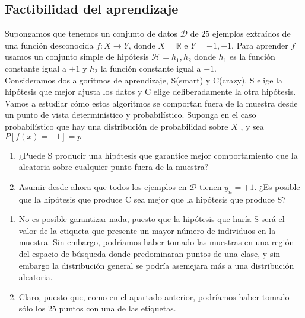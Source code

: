 \documentclass[11pt,leqno]{article}
\theoremstyle{definition}
\begin{document}
\subsection{Factibilidad del aprendizaje}
\begin{cuestion}
Supongamos que tenemos un conjunto de datos $\mathcal{D}$ de $25$ ejemplos extraídos de una función desconocida $f: X \rightarrow Y$, donde $X = \mathbb{R}$ e $Y = {-1, +1}$. Para aprender $f$ usamos un conjunto simple de hipótesis $\mathcal{H} = {h_1 , h_2 }$ donde $h_1$ es la función constante igual a $+1$ y $h_2$ la función constante igual a $-1$.\\
Consideramos dos algoritmos de aprendizaje, S(smart) y C(crazy). S elige la hipótesis
que mejor ajusta los datos y C elige deliberadamente la otra hipótesis. Vamos a estudiar cómo estos algoritmos se comportan fuera de la muestra desde un punto de vista determinístico y probabilístico. Suponga en el caso probabilístico que hay una distribución de probabilidad sobre $X$ , y sea $P[f(x) = +1] = p$
\begin{enumerate}[a]
\item ¿Puede S producir una hipótesis que garantice mejor comportamiento que la aleatoria sobre cualquier punto fuera de la muestra?
\item Asumir desde ahora que todos los ejemplos en $\mathcal{D}$ tienen $y_n = +1$. ¿Es posible que la hipótesis que produce C sea mejor que la hipótesis que produce S?
\end{enumerate}
\end{cuestion}

\begin{solucion}
\begin{enumerate}[a]
\item No es posible garantizar nada, puesto que la hipótesis que haría S será el valor de la etiqueta que presente un mayor número de individuos en la muestra. Sin embargo, podríamos haber tomado las muestras en una región del espacio de búsqueda donde predominaran puntos de una clase, y sin embargo  la distribución general se podría asemejara más a una distribución aleatoria.
\item Claro, puesto que, como en el apartado anterior, podríamos haber tomado sólo los 25 puntos con una de las etiquetas.
\end{enumerate}
\end{solucion}
\end{document}

